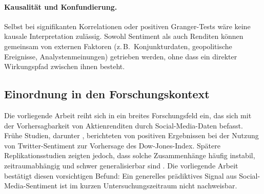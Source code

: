 \paragraph{Kausalität und Konfundierung.}
Selbst bei signifikanten Korrelationen oder positiven Granger-Tests wäre keine kausale Interpretation zulässig. Sowohl Sentiment als auch Renditen können gemeinsam von externen Faktoren (z.\,B.\ Konjunkturdaten, geopolitische Ereignisse, Analystenmeinungen) getrieben werden, ohne dass ein direkter Wirkungspfad zwischen ihnen besteht.

\subsection{Einordnung in den Forschungskontext}

Die vorliegende Arbeit reiht sich in ein breites Forschungsfeld ein, das sich mit der Vorhersagbarkeit von Aktienrenditen durch Social-Media-Daten befasst. Frühe Studien, darunter \textcite{bollen2011twitter}, berichteten von positiven Ergebnissen bei der Nutzung von Twitter-Sentiment zur Vorhersage des Dow-Jones-Index. Spätere Replikationsstudien zeigten jedoch, dass solche Zusammenhänge häufig instabil, zeitraumabhängig und schwer generalisierbar sind \autocite{ranco2015effects}. Die vorliegende Arbeit bestätigt diesen vorsichtigen Befund: Ein generelles prädiktives Signal aus Social-Media-Sentiment ist im kurzen Untersuchungszeitraum nicht nachweisbar.
